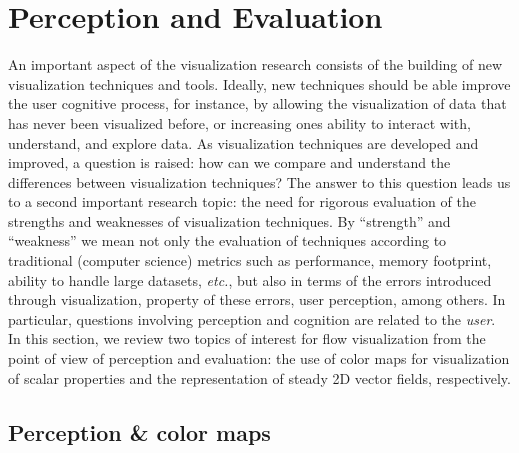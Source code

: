 \section{Perception and Evaluation}
\label{sec:perceptionandevaluation}

An important aspect of the visualization research consists of the building of new visualization techniques and tools.
%
Ideally, new techniques should be able improve the user cognitive process\cite{Tory:2004:HFV:951847.951892}, for instance, by allowing the visualization of data that has never been visualized before, or increasing ones ability to interact with, understand, and explore data.
%
As visualization techniques are developed and improved, a question is raised: how can we compare and understand the differences between visualization techniques?
%
The answer to this question leads us to a second important research topic:
%
the need for rigorous evaluation of the strengths and weaknesses of visualization techniques.
%
By ``strength'' and ``weakness'' we mean not only the evaluation of techniques according to traditional (computer science) metrics such as performance, memory footprint, ability to handle large datasets, {\em etc.}, but also in terms of the errors introduced through visualization, property of these errors, user perception, among others.
% 
In particular, questions involving perception and cognition are related to the \emph{user}.
%
In this section, we review two topics of interest for flow visualization from the point of view of  perception and evaluation: the use of color maps for visualization of scalar properties and the representation of steady 2D vector fields, respectively.

\subsection{Perception \& color maps}

%
%		
%	
%	
%	
%	

